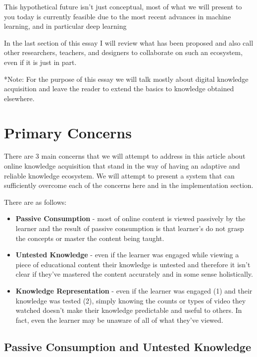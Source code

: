\documentclass[]{book}
\theoremstyle{definition}
\theoremstyle{definition}
\theoremstyle{definition}
\theoremstyle{remark}
\begin{document}
This hypothetical future isn't just conceptual, most of what we will
present to you today is currently feasible due to the most recent
advances in machine learning, and in particular deep learning

In the last section of this essay I will review what has been proposed
and also call other researchers, teachers, and designers to collaborate
on such an ecosystem, even if it is just in part.

*Note: For the purpose of this essay we will talk mostly about digital
knowledge acquisition and leave the reader to extend the basics to
knowledge obtained elsewhere.

\chapter{Primary Concerns}\label{primary-concerns}

There are 3 main concerns that we will attempt to address in this
article about online knowledge acquisition that stand in the way of
having an adaptive and reliable knowledge ecosystem. We will attempt to
present a system that can sufficiently overcome each of the concerns
here and in the implementation section.

There are as follows:

\begin{itemize}
\item
  \textbf{Passive Consumption} - most of online content is viewed
  passively by the learner and the result of passive consumption is that
  learner's do not grasp the concepts or master the content being
  taught.
\item
  \textbf{Untested Knowledge} - even if the learner was engaged while
  viewing a piece of educational content their knowledge is untested and
  therefore it isn't clear if they've mastered the content accurately
  and in some sense holistically.
\item
  \textbf{Knowledge Representation} - even if the learner was engaged
  (1) and their knowledge was tested (2), simply knowing the counts or
  types of video they watched doesn't make their knowledge predictable
  and useful to others. In fact, even the learner may be unaware of all
  of what they've viewed.
\end{itemize}

\section{Passive Consumption and Untested
Knowledge}\label{passive-consumption-and-untested-knowledge}
\end{document}
